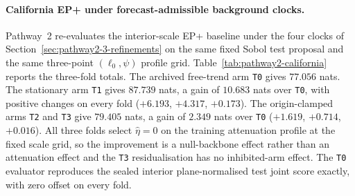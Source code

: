 \begin{table}[htbp]\centering
{}
\caption{Training negative log-likelihood at fixed $\sigma_0$ (km), with $(a,d,n,c,p,\alpha_s,q)$ re-optimized at each point, full-plane normalization and accepted EP+ background weights. Lower values are better.}
\label{tab:sigma0-profile}
\end{table}

\paragraph{California EP+ under forecast-admissible background clocks.}
Pathway~2 re-evaluates the interior-scale EP+ baseline under the four clocks of Section~\ref{sec:pathway2-3-refinements} on the same fixed Sobol test proposal and the same three-point $(\ell_0,\psi)$ profile grid. Table~\ref{tab:pathway2-california} reports the three-fold totals. The archived free-trend arm \texttt{T0} gives $77.056$ nats. The stationary arm \texttt{T1} gives $87.739$ nats, a gain of $10.683$ nats over \texttt{T0}, with positive changes on every fold ($+6.193$, $+4.317$, $+0.173$). The origin-clamped arms \texttt{T2} and \texttt{T3} give $79.405$ nats, a gain of $2.349$ nats over \texttt{T0} ($+1.619$, $+0.714$, $+0.016$). All three folds select $\hat\eta=0$ on the training attenuation profile at the fixed scale grid, so the improvement is a null-backbone effect rather than an attenuation effect and the \texttt{T3} residualisation has no inhibited-arm effect. The \texttt{T0} evaluator reproduces the sealed interior plane-normalised test joint score exactly, with zero offset on every fold.


